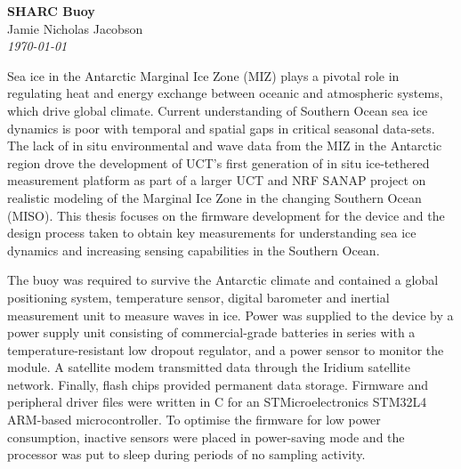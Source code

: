\documentclass[a4paper, 12pt, oneside, openright, parskip=full]{book}
\newcommand{\auth}{Jamie Nicholas Jacobson}								%
\newcommand{\titl}{SHARC Buoy}						%
\begin{document}
%
\begin{center}
	\textbf{\Large \titl}\\
			\vskip 0.2cm
			\auth\\
			\vskip 0.2cm
	\textit{\footnotesize\today}
		
\end{center}
Sea ice in the Antarctic Marginal Ice Zone (MIZ) plays a pivotal role in regulating heat and energy exchange between oceanic and atmospheric systems, which drive global climate. Current understanding of Southern Ocean sea ice dynamics is poor with temporal and spatial gaps in critical seasonal data-sets. The lack of in situ environmental and wave data from the MIZ in the Antarctic region drove the development of UCT’s first generation of in situ ice-tethered measurement platform as part of a larger UCT and NRF SANAP project on realistic modeling of the Marginal Ice Zone in the changing Southern Ocean (MISO). This thesis focuses on the firmware development for the device and the design process taken to obtain key measurements for understanding sea ice dynamics and increasing sensing capabilities in the Southern Ocean.\par 

The buoy was required to survive the Antarctic climate and contained a global positioning system, temperature sensor, digital barometer and inertial measurement unit to measure waves in ice. Power was supplied to the device by a power supply unit consisting of commercial-grade batteries in series with a temperature-resistant low dropout regulator, and a power sensor to monitor the module. A satellite modem transmitted data through the Iridium satellite network. Finally, flash chips provided permanent data storage. Firmware and peripheral driver files were written in C for an STMicroelectronics STM32L4 ARM-based microcontroller. To optimise the firmware for low power consumption, inactive sensors were placed in power-saving mode and the processor was put to sleep during periods of no sampling activity. \par 
\end{document}
